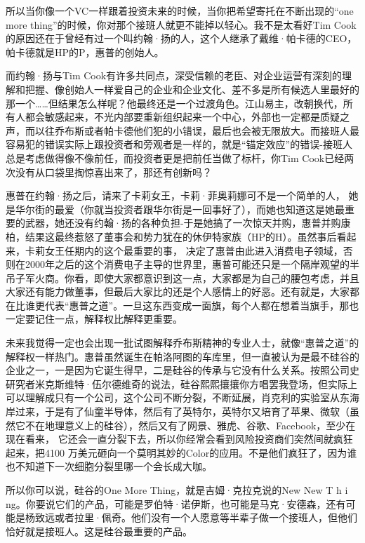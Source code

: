 所以当你像一个VC一样跟着投资未来的时候，当你把希望寄托在不断出现的``one
more thing''的时候，你对那个接班人就更不能掉以轻心。我不是太看好Tim
Cook的原因还在于曾经有过一个叫约翰·扬的人，这个人继承了戴维·帕卡德的CEO，帕卡德就是HP的P，惠普的创始人。

而约翰·扬与Tim
Cook有许多共同点，深受信赖的老臣、对企业运营有深刻的理解和把握、像创始人一样爱自己的企业和企业文化、差不多是所有候选人里最好的那一个\ldots\ldots 但结果怎么样呢？他最终还是一个过渡角色。江山易主，改朝换代，所有人都会敏感起来，不光内部要重新组织起来一个中心，外部也一定都是质疑之声，而以往乔布斯或者帕卡德他们犯的小错误，最后也会被无限放大。而接班人最容易犯的错误实际上跟投资者和旁观者是一样的，就是``锚定效应''的错误-接班人总是考虑做得像不像前任，而投资者更是把前任当做了标杆，你Tim
Cook已经两次没有从口袋里掏惊喜出来了，那还有创新吗？

惠普在约翰·扬之后，请来了卡莉女王，卡莉·菲奥莉娜可不是一个简单的人，
她是华尔街的最爱（你就当投资者跟华尔街是一回事好了），而她也知道这是她最重要的武器，她还没有约翰·扬的各种负担-于是她搞了一次惊天并购，惠普并购康柏，结果这最终惹怒了董事会和势力犹在的休伊特家族（HP的H）。虽然事后看起来，卡莉女王任期内的这个最重要的事，
决定了惠普由此进入消费电子领域，否则在2000年之后的这个消费电子主导的世界里，惠普可能还只是一个隔岸观望的半吊子军火商。你看，即使大家都意识到这一点，大家都是为自己的腰包考虑，并且大家还有能力做董事，但最后大家比的还是个人感情上的好恶。还有就是，大家都在比谁更代表``惠普之道''。一旦这东西变成一面旗，每个人都在想着当旗手，那也一定要记住一点，解释权比解释更重要。

未来我觉得一定也会出现一批试图解释乔布斯精神的专业人士，就像``惠普之道''的解释权一样热门。惠普虽然诞生在帕洛阿图的车库里，但一直被认为是最不硅谷的企业之一，一是因为它诞生得早，二是硅谷的传承与它没有什么关系。按照公司史研究者米克斯维特·伍尔德维奇的说法，硅谷熙熙攘攘你方唱罢我登场，但实际上可以理解成只有一个公司，这个公司不断分裂，不断延展，肖克利的实验室从东海岸过来，于是有了仙童半导体，然后有了英特尔，英特尔又培育了苹果、微软（虽然它不在地理意义上的硅谷），然后又有了网景、雅虎、谷歌、Facebook，至少在现在看来，
它还会一直分裂下去，所以你经常会看到风险投资商们突然间就疯狂起来，把4100
万美元砸向一个莫明其妙的Color的应用。不是他们疯狂了，因为谁也不知道下一次细胞分裂里哪一个会长成大咖。

所以你可以说，硅谷的One More Thing，就是吉姆·克拉克说的New New T h i
ng。你要说它们的产品，可能是罗伯特·诺伊斯，也可能是马克·安德森，还有可能是杨致远或者拉里·佩奇。他们没有一个人愿意等半辈子做一个接班人，但他们恰好就是接班人。这是硅谷最重要的产品。


